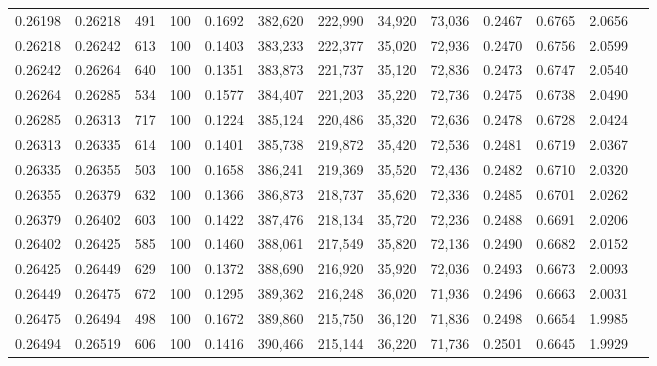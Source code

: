 \begin{tabular}{rrrrrrrrrrrrr}
0.26198 & 0.26218 &   491 & 100 &                                     0.1692 & 382,620 & 222,990 &  34,920 &  73,036 & 0.2467 & 0.6765 & 2.0656 \\
0.26218 & 0.26242 &   613 & 100 &                                     0.1403 & 383,233 & 222,377 &  35,020 &  72,936 & 0.2470 & 0.6756 & 2.0599 \\
0.26242 & 0.26264 &   640 & 100 &                                     0.1351 & 383,873 & 221,737 &  35,120 &  72,836 & 0.2473 & 0.6747 & 2.0540 \\
0.26264 & 0.26285 &   534 & 100 &                                     0.1577 & 384,407 & 221,203 &  35,220 &  72,736 & 0.2475 & 0.6738 & 2.0490 \\
0.26285 & 0.26313 &   717 & 100 &                                     0.1224 & 385,124 & 220,486 &  35,320 &  72,636 & 0.2478 & 0.6728 & 2.0424 \\
0.26313 & 0.26335 &   614 & 100 &                                     0.1401 & 385,738 & 219,872 &  35,420 &  72,536 & 0.2481 & 0.6719 & 2.0367 \\
0.26335 & 0.26355 &   503 & 100 &                                     0.1658 & 386,241 & 219,369 &  35,520 &  72,436 & 0.2482 & 0.6710 & 2.0320 \\
0.26355 & 0.26379 &   632 & 100 &                                     0.1366 & 386,873 & 218,737 &  35,620 &  72,336 & 0.2485 & 0.6701 & 2.0262 \\
0.26379 & 0.26402 &   603 & 100 &                                     0.1422 & 387,476 & 218,134 &  35,720 &  72,236 & 0.2488 & 0.6691 & 2.0206 \\
0.26402 & 0.26425 &   585 & 100 &                                     0.1460 & 388,061 & 217,549 &  35,820 &  72,136 & 0.2490 & 0.6682 & 2.0152 \\
0.26425 & 0.26449 &   629 & 100 &                                     0.1372 & 388,690 & 216,920 &  35,920 &  72,036 & 0.2493 & 0.6673 & 2.0093 \\
0.26449 & 0.26475 &   672 & 100 &                                     0.1295 & 389,362 & 216,248 &  36,020 &  71,936 & 0.2496 & 0.6663 & 2.0031 \\
0.26475 & 0.26494 &   498 & 100 &                                     0.1672 & 389,860 & 215,750 &  36,120 &  71,836 & 0.2498 & 0.6654 & 1.9985 \\
0.26494 & 0.26519 &   606 & 100 &                                     0.1416 & 390,466 & 215,144 &  36,220 &  71,736 & 0.2501 & 0.6645 & 1.9929 \\

\end{tabular}
